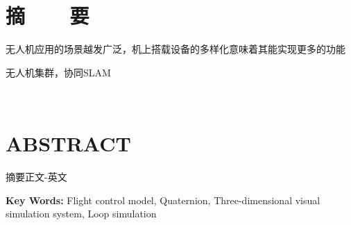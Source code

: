 

\renewcommand{\baselinestretch}{1.5}
\fontsize{12pt}{13pt} \selectfont

\chapter*{摘~~~~要}

\vspace{1em}


无人机应用的场景越发广泛，机上搭载设备的多样化意味着其能实现更多的功能




\vspace{0.1in}
 无人机集群，协同SLAM


﻿﻿


\chapter*{ABSTRACT}
\noindent 
\vspace{1em}


摘要正文-英文



\vspace{0.1in}
\noindent \textbf{Key Words:} Flight control model, Quaternion, Three-dimensional visual simulation system, Loop simulation
